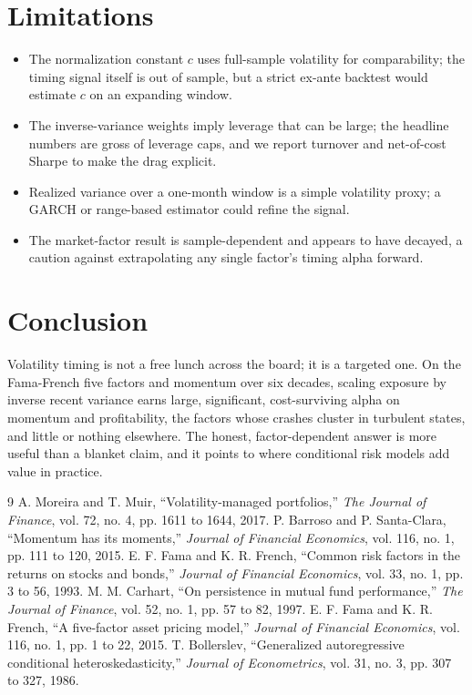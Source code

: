 \documentclass[11pt]{article}
\begin{document}
\section{Limitations}

\begin{itemize}[nosep]
    \item The normalization constant $c$ uses full-sample volatility for comparability; the timing signal itself is out of sample, but a strict ex-ante backtest would estimate $c$ on an expanding window.
    \item The inverse-variance weights imply leverage that can be large; the headline numbers are gross of leverage caps, and we report turnover and net-of-cost Sharpe to make the drag explicit.
    \item Realized variance over a one-month window is a simple volatility proxy; a GARCH or range-based estimator could refine the signal.
    \item The market-factor result is sample-dependent and appears to have decayed, a caution against extrapolating any single factor's timing alpha forward.
\end{itemize}

\section{Conclusion}

Volatility timing is not a free lunch across the board; it is a targeted one. On the Fama-French five factors and momentum over six decades, scaling exposure by inverse recent variance earns large, significant, cost-surviving alpha on momentum and profitability, the factors whose crashes cluster in turbulent states, and little or nothing elsewhere. The honest, factor-dependent answer is more useful than a blanket claim, and it points to where conditional risk models add value in practice.

\medskip

\begin{thebibliography}{9}
 A. Moreira and T. Muir, ``Volatility-managed portfolios,'' \textit{The Journal of Finance}, vol. 72, no. 4, pp. 1611 to 1644, 2017.
 P. Barroso and P. Santa-Clara, ``Momentum has its moments,'' \textit{Journal of Financial Economics}, vol. 116, no. 1, pp. 111 to 120, 2015.
 E. F. Fama and K. R. French, ``Common risk factors in the returns on stocks and bonds,'' \textit{Journal of Financial Economics}, vol. 33, no. 1, pp. 3 to 56, 1993.
 M. M. Carhart, ``On persistence in mutual fund performance,'' \textit{The Journal of Finance}, vol. 52, no. 1, pp. 57 to 82, 1997.
 E. F. Fama and K. R. French, ``A five-factor asset pricing model,'' \textit{Journal of Financial Economics}, vol. 116, no. 1, pp. 1 to 22, 2015.
 T. Bollerslev, ``Generalized autoregressive conditional heteroskedasticity,'' \textit{Journal of Econometrics}, vol. 31, no. 3, pp. 307 to 327, 1986.
\end{thebibliography}
\end{document}
